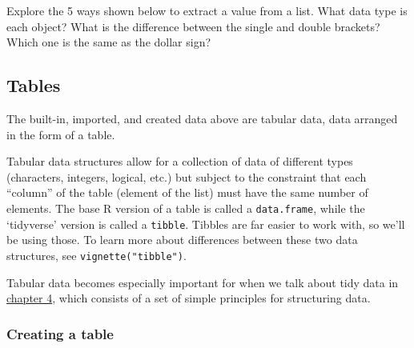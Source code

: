 \documentclass[
  oneside]{book}
\newenvironment{Shaded}{\begin{snugshade}}{\end{snugshade}}
\newcommand{\DecValTok}[1]{\textcolor[rgb]{0.00,0.00,0.81}{#1}}
\newcommand{\NormalTok}[1]{#1}
\newcommand{\OtherTok}[1]{\textcolor[rgb]{0.56,0.35,0.01}{#1}}
\newcommand{\SpecialCharTok}[1]{\textcolor[rgb]{0.00,0.00,0.00}{#1}}
\newcommand{\StringTok}[1]{\textcolor[rgb]{0.31,0.60,0.02}{#1}}
\begin{document}
\begin{try}

Explore the 5 ways shown below to extract a value from a list. What data type is each object? What is the difference between the single and double brackets? Which one is the same as the dollar sign?

\begin{Shaded}
\end{Shaded}

\end{try}

\hypertarget{tables-data}{%
\subsection{Tables}\label{tables-data}}

The built-in, imported, and created data above are tabular data, data arranged in the form of a table.

Tabular data structures allow for a collection of data of different types (characters, integers, logical, etc.) but subject to the constraint that each ``column'' of the table (element of the list) must have the same number of elements. The base R version of a table is called a \texttt{data.frame}, while the `tidyverse' version is called a \texttt{tibble}. Tibbles are far easier to work with, so we'll be using those. To learn more about differences between these two data structures, see \texttt{vignette("tibble")}.

Tabular data becomes especially important for when we talk about tidy data in \protect\hyperlink{tidyr}{chapter 4}, which consists of a set of simple principles for structuring data.

\hypertarget{creating-a-table}{%
\subsubsection{Creating a table}\label{creating-a-table}}
\end{document}
